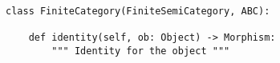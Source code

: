 \begin{verbatim}
class FiniteCategory(FiniteSemiCategory, ABC):

    def identity(self, ob: Object) -> Morphism:
        """ Identity for the object """
\end{verbatim}